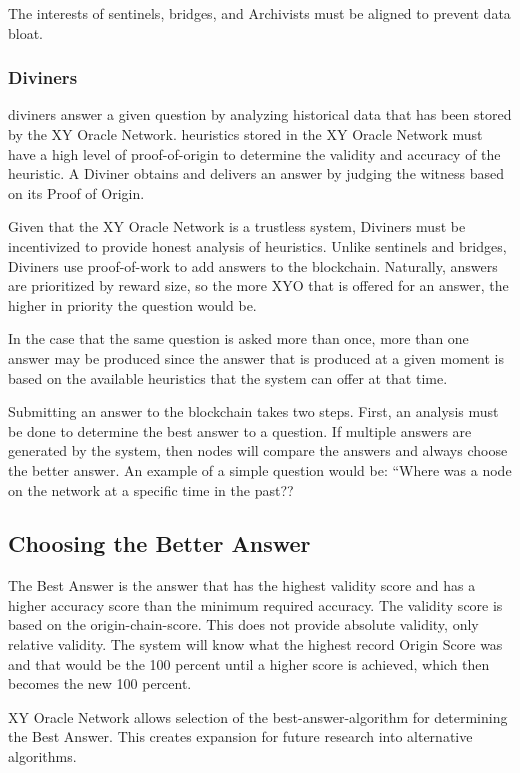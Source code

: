 \documentclass{article}
\begin{document}
The interests of \Glspl{sentinel}, \Glspl{bridge}, and Archivists must be aligned to prevent data bloat.

\subsubsection {Diviners}
\Glspl{diviner} answer a given question by analyzing historical data that has been stored by the XY Oracle Network. \Glspl{heuristic} stored in the XY Oracle Network must have a high level of \Gls{proof-of-origin} to determine the validity and \gls{accuracy} of the heuristic. A Diviner obtains and delivers an answer by judging the witness based on its Proof of Origin.

Given that the XY Oracle Network is a trustless system, Diviners must be incentivized to provide honest analysis of heuristics. Unlike \Glspl{sentinel} and \Glspl{bridge}, Diviners use \Gls{proof-of-work} to add answers to the blockchain. Naturally, answers are prioritized by reward size, so the more XYO that is offered for an answer, the higher in priority the question would be.

In the case that the same question is asked more than once, more than one answer may be produced since the answer that is produced at a given moment is based on the available heuristics that the system can offer at that time.

Submitting an answer to the blockchain takes two steps. First, an analysis must be done to determine the best answer to a question. If multiple answers are generated by the system, then nodes will compare the answers and always choose the better answer. An example of a simple question would be: ``Where was a node on the network at a specific time in the past??

\subsection {Choosing the Better Answer}
The Best Answer is the answer that has the highest validity score and has a higher \gls{accuracy} score than the minimum required accuracy. The validity score is based on the \Gls{origin-chain-score}. This does not provide absolute validity, only relative validity. The system will know what the highest record Origin Score was and that would be the 100 percent until a higher score is achieved, which then becomes the new 100 percent.

XY Oracle Network allows selection of the \Gls{best-answer-algorithm} for determining the Best Answer. This creates expansion for future research into alternative algorithms.
\end{document}
